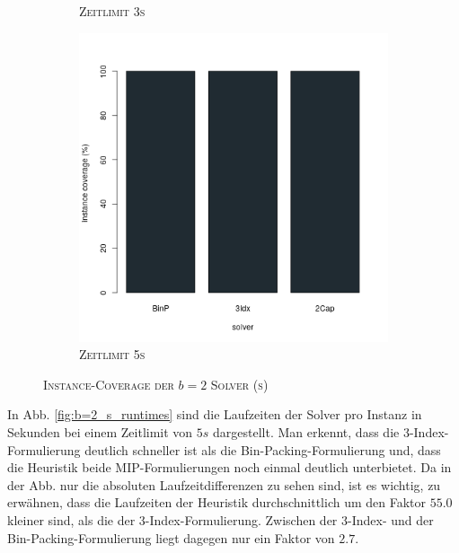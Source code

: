 \begin{figure}[H]
\begin{subfigure}[b]{0.3\textwidth}
\caption{\textsc{Zeitlimit 3s}}
\label{fig:instance_cov_b=2_s_b}
\end{subfigure}
\hfill
\begin{subfigure}[b]{0.3\textwidth}
\centering
\includegraphics[width=1.2\textwidth]{img/solver_instance_coverage_b=2_s_5s.png}
\caption{\textsc{Zeitlimit 5s}}
\label{fig:instance_cov_b=2_s_c}
\end{subfigure}

\caption{\textsc{Instance-Coverage der $b=2$ Solver (s)}}
\label{fig:instance_cov_b=2_s}
\end{figure}

\pagebreak

In Abb. \ref{fig:b=2_s_runtimes} sind die Laufzeiten der Solver pro Instanz in Sekunden bei einem Zeitlimit von $5s$ dargestellt.
Man erkennt, dass die 3-Index-Formulierung deutlich schneller ist als die Bin-Packing-Formulierung und, dass die Heuristik beide MIP-Formulierungen noch einmal deutlich unterbietet. Da in der Abb. nur die absoluten Laufzeitdifferenzen zu sehen sind,
ist es wichtig, zu erwähnen, dass die Laufzeiten der Heuristik durchschnittlich um den Faktor $55.0$ kleiner sind,
als die der 3-Index-Formulierung. Zwischen der 3-Index- und der Bin-Packing-Formulierung liegt dagegen nur ein Faktor von $2.7$.

